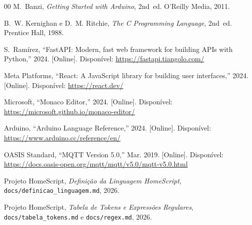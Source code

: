 \documentclass[conference]{IEEEtran}
\begin{document}
\begin{thebibliography}{00}
M.~Banzi,
\textit{Getting Started with Arduino}, 2nd~ed.
O'Reilly Media, 2011.

B.~W. Kernighan e D.~M. Ritchie,
\textit{The C Programming Language}, 2nd~ed.
Prentice Hall, 1988.

S.~Ramírez,
``FastAPI: Modern, fast web framework for building APIs with Python,''
2024. [Online]. Disponível: \url{https://fastapi.tiangolo.com/}

Meta Platforms,
``React: A JavaScript library for building user interfaces,''
2024. [Online]. Disponível: \url{https://react.dev/}

Microsoft,
``Monaco Editor,''
2024. [Online]. Disponível:
\url{https://microsoft.github.io/monaco-editor/}

Arduino,
``Arduino Language Reference,''
2024. [Online]. Disponível: \url{https://www.arduino.cc/reference/en/}

OASIS Standard,
``MQTT Version 5.0,'' Mar. 2019. [Online]. Disponível:
\url{https://docs.oasis-open.org/mqtt/mqtt/v5.0/mqtt-v5.0.html}

Projeto HomeScript,
\textit{Definição da Linguagem HomeScript},
\texttt{docs/definicao\_linguagem.md}, 2026.

Projeto HomeScript,
\textit{Tabela de Tokens e Expressões Regulares},
\texttt{docs/tabela\_tokens.md} e \texttt{docs/regex.md}, 2026.

\end{thebibliography}
\end{document}
